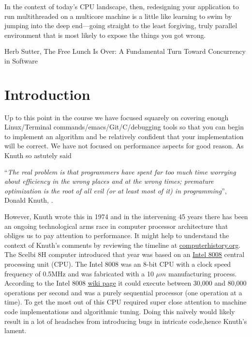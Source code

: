 
\epigraph{ In the context of today’s CPU landscape, then, redesigning your application to run multithreaded on a multicore machine is a little like learning to swim by jumping into the deep end—going straight to the least forgiving, truly parallel environment that is most likely to expose the things you got wrong.}{Herb Sutter, The Free Lunch Is Over: A Fundamental Turn Toward Concurrency in Software}

\minitoc

\section{Introduction}
Up to this point in the course we have focused squarely on covering enough Linux/Terminal commands/emacs/Git/C/debugging tools so that you can begin to implement an algorithm and be relatively confident that your implementation will be correct. We have not focused on performance aspects for good reason. As Knuth so astutely said 

``\emph{The real problem is that programmers have spent far too much time worrying about efficiency in the wrong places and at the wrong times; premature optimization is the root of all evil (or at least most of it) in programming}'', Donald Knuth, \cite{knuth1974computer}.

However, Knuth wrote this in 1974 and in the intervening 45 years there has been an ongoing technological arms race in computer processor architecture that obliges us to pay attention to performance. It might help to understand the context of Knuth's comments by reviewing the timeline at \href{https://www.computerhistory.org/timeline/1974/}{computerhistory.org}. The Scelbi 8H computer introduced that year was based on an \href{https://en.wikipedia.org/wiki/Intel_8008}{Intel 8008} central processing unit (CPU). The Intel 8008 was an 8-bit CPU with a clock speed frequency of 0.5MHz and was fabricated with a 10 $\mu m$ manufacturing process. According to the Intel 8008 \href{https://en.wikipedia.org/wiki/Intel_8008}{wiki page} it could execute between 30,000 and 80,000 operations per second and was a purely sequential processor (one operation at a time). To get the most out of this CPU required super close attention to machine code implementations and algorithmic tuning. Doing this na\"{i}vely would likely result in a lot of headaches from introducing bugs in intricate code,hence Knuth's lament. 

